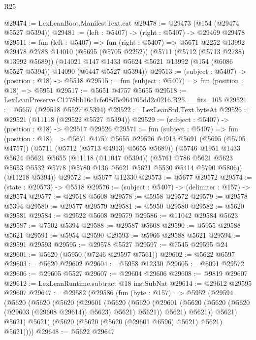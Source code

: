 \begin{lexlean}{R25}
\begin{coremodule}
@29474 := LexLeanBoot.ManifestText.cat
@29478 := @29473 (@154 (@29474 @5527 @5394))
@29481 := (left : @5407) -> (right : @5407) -> @29469 @29478
@29511 := fun (left : @5407) =>
  fun (right : @5407) =>
  @5671
    @2252
    @13992
    @29478
    @2788
    @14010
    (@5695 (@5705 @2252))
    (@5711 (@5712 (@5713 @2788) @13992 @5689))
    (@14021 @147 @1433 @5624 @5621 @13992 (@154 (@6086 @5527 @5394)) @14090 (@6447 @5527 @5394))
@29513 := (subject : @5407) -> (position : @18) -> @5518
@29515 := fun (subject : @5407) => fun (position : @18) => @5951
@29517 := @5651 @4757 @5655
@29518 := LexLeanPreserve.C1778bb16c1cfe08d5e964765dd2c0216.R25.__fits_105
@29521 := @5657 (@29518 @5527 @5394)
@29522 := LexLeanStd.Text.byteAt
@29526 := @29521 (@11118 (@29522 @5527 @5394))
@29529 := (subject : @5407) -> (position : @18) -> @29517 @29526
@29571 := fun (subject : @5407) =>
  fun (position : @18) =>
  @5671
    @4757
    @5655
    @29526
    @4913
    @5691
    (@5695 (@5705 @4757))
    (@5711 (@5712 (@5713 @4913) @5655 @5689))
    (@5746
      @1951
      @1433
      @5624
      @5621
      @5655
      (@11118 (@11047 @5394))
      (@5761 @786 @5621 @5623 @5653 @5532 @5778 (@5780 @136 @5621 @5621 @5530 @5414 @5790 @5806))
      (@11218 @5394))
@29572 := @5677 @12330
@29573 := @5677 @29572
@29574 := (state : @29573) -> @5518
@29576 := (subject : @5407) -> (delimiter : @157) -> @29574
@29577 := @29518 @5608
@29578 := @5958 @29572
@29579 := @29578 @5394
@29580 := @29577 @29579
@29581 := @5950 @29580
@29582 := @5620 @29581
@29584 := @29522 @5608 @29579
@29586 := @11042 @29584 @5623
@29587 := @7502 @5394
@29588 := @29587 @5608
@29590 := @5955 @29588 @5621
@29591 := @5954 @29590
@29593 := @5966 @29588 @5621
@29594 := @29591 @29593
@29595 := @29578 @5527
@29597 := @7545 @29595 @24
@29601 := @5620 (@5950 (@7246 @29597 @7561))
@29602 := @5622 @6597
@29603 := @5620 @29602
@29604 := @5958 @12330
@29605 := @6091 @29572
@29606 := @29605 @5527
@29607 := @29604 @29606
@29608 := @9819 @29607
@29612 := LexLeanRuntime.subtract @18 instSubNat
@29614 := @29612 @29595 @29607
@29647 := @29582
    (@29586
      (fun (byte : @157) =>
      @5952
        (@29594
          (@5620
            (@5620
              (@5620
                (@29601
                  (@5620
                    (@5620
                      (@29601 (@5620 (@5620 (@5620 (@29603 (@29608 @29614)) @5623) @5621) @5621))
                      @5621)
                    @5621))
                @5621)
              @5621)
            @5621)
          (@5620 (@5620 (@5620 (@29601 @6596) @5621) @5621) @5621))))
@29648 := @5622 @29647

\end{coremodule}
\end{lexlean}
